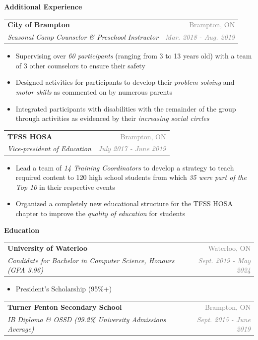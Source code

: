 \documentclass[letterpaper,11pt]{article}
\makeatletter
\newcommand{\resheading}[1]{{\large \colorbox{LightMidnightBlue}{\begin{minipage}{\textwidth}{\textbf{\textrm{#1 \vphantom{p\^{E}}}}}\end{minipage}}}}
\newcommand{\ressubheading}[4]{
\begin{tabular*}{7in}{l@{\extracolsep{\fill}}r}
        \textbf{#1} & \textcolor{gray}{#2} \\
        \textit{#3} & \textcolor{gray}{\textit{#4}} \\
\end{tabular*}\vspace{-6pt}}
\makeatother
\begin{document}
\resheading{Additional Experience}

\vspace{2mm}

    \ressubheading{City of Brampton}{Brampton, ON}{Seasonal Camp Counselor \& Preschool Instructor}{Mar. 2018 - Aug. 2019}
        \begin{itemize}
        \setlength\itemsep{0.75mm}
            \item Supervising over \textit{60 participants} (ranging from 3 to 13 years old) with a team of 3 other counselors to ensure their safety
            \item Designed activities for participants to develop their \textit{problem solving} and \textit{motor skills} as commented on by numerous parents
            \item Integrated participants with disabilities with the remainder of the group through activities as evidenced by their \textit{increasing social circles}
        \end{itemize}
    
    \ressubheading{TFSS HOSA}{Brampton, ON}{Vice-president of Education}{July 2017 - June 2019}
    \begin{itemize}
    \setlength\itemsep{0.75mm}
        \item Lead a team of \textit{14 Training Coordinators} to develop a strategy to teach required content to 120 high school students from which \textit{35 were part of the Top 10} in their respective events
        \item Organized a completely new educational structure for the TFSS HOSA chapter to improve the \textit{quality of education} for students
    \end{itemize}

\resheading{Education}

\vspace{2mm}

\ressubheading{University of Waterloo}{Waterloo, ON}{Candidate for Bachelor in Computer Science, Honours (GPA 3.96)}{Sept. 2019 - May 2024}

\begin{itemize}
    \setlength\itemsep{0.75mm}
    \item President's Scholarship (95\%+)
\end{itemize}

\ressubheading{Turner Fenton Secondary School}{Brampton, ON}{IB Diploma \& OSSD (99.2\% University Admissions Average)}{Sept. 2015 - June 2019}
\end{document}
